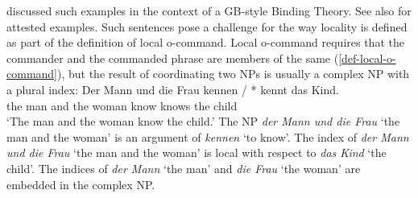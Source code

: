 \documentclass[output=paper
 	        ,biblatex
                ,babelshorthands
                ,newtxmath
                ,draftmode
                ,colorlinks, citecolor=brown
]{langscibook}
\begin{document}
\citet[]{Fanselow87a} discussed such examples in the context of a GB-style Binding
Theory. See also  for attested examples.
Such sentences pose a challenge for the way locality is defined as part of the definition of local
o-command. Local o-command requires that the commander and the commanded phrase are members of the
same \argstl (\ref{def-local-o-command}), but the result of coordinating two NPs is usually a complex NP with a plural index:
\ea
\gll Der Mann und die Frau kennen / * kennt das Kind.\\
     the man  and the woman know {} {} knows the child\\
\glt `The man and the woman know the child.'
\z
The NP \emph{der Mann und die Frau} `the man and the woman' is an argument of \emph{kennen} `to know'. The index of
\emph{der Mann und die Frau} `the man and the woman' is local with respect to \emph{das Kind} `the child'. The indices of
\emph{der Mann} `the man' and \emph{die Frau} `the woman' are embedded in the complex NP.
\end{document}
